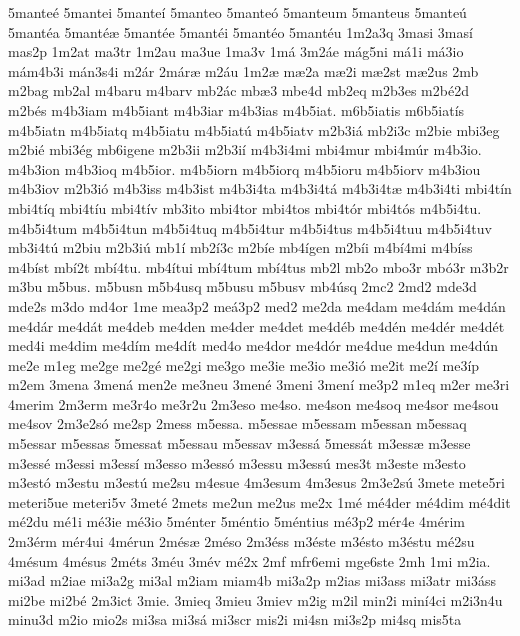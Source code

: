 {5mante^^e9
5mantei
5mante^^ed
5manteo
5mante^^f3
5manteum
5manteus
5mante^^fa
5mant^^e9a
5mant^^e9^^e6
5mant^^e9e
5mant^^e9i
5mant^^e9o
5mant^^e9u
1m2a3q
3masi
3mas^^ed
mas2p
1m2at
ma3tr
1m2au
ma3ue
1ma3v
1m^^e1
3m2^^e1e
m^^e1g5ni
m^^e11i
m^^e13io
m^^e1m4b3i
m^^e1n3s4i
m2^^e1r
2m^^e1r^^e6
m2^^e1u
1m2^^e6
m^^e62a
m^^e62i
m^^e62st
m^^e62us
2mb
m2bag
mb2al
m4baru
m4barv
mb2^^e1c
mb^^e63
mbe4d
mb2eq
m2b3es
m2b^^e92d
m2b^^e9s
m4b3iam
m4b5iant
m4b3iar
m4b3ias
m4b5iat.
m6b5iatis
m6b5iat^^eds
m4b5iatn
m4b5iatq
m4b5iatu
m4b5iat^^fa
m4b5iatv
m2b3i^^e1
mb2i3c
m2bie
mbi3eg
m2bi^^e9
mbi3^^e9g
mb6igene
m2b3ii
m2b3i^^ed
m4b3i4mi
mbi4mur
mbi4m^^far
m4b3io.
m4b3ion
m4b3ioq
m4b5ior.
m4b5iorn
m4b5iorq
m4b5ioru
m4b5iorv
m4b3iou
m4b3iov
m2b3i^^f3
m4b3iss
m4b3ist
m4b3i4ta
m4b3i4t^^e1
m4b3i4t^^e6
m4b3i4ti
mbi4t^^edn
mbi4t^^edq
mbi4t^^edu
mbi4t^^edv
mb3ito
mbi4tor
mbi4tos
mbi4t^^f3r
mbi4t^^f3s
m4b5i4tu.
m4b5i4tum
m4b5i4tun
m4b5i4tuq
m4b5i4tur
m4b5i4tus
m4b5i4tuu
m4b5i4tuv
mb3i4t^^fa
m2biu
m2b3i^^fa
mb1^^ed
mb2^^ed3c
m2b^^ede
mb4^^edgen
m2b^^edi
m4b^^ed4mi
m4b^^edss
m4b^^edst
mb^^ed2t
mb^^ed4tu.
mb4^^edtui
mb^^ed4tum
mb^^ed4tus
mb2l
mb2o
mbo3r
mb^^f33r
m3b2r
m3bu
m5bus.
m5busn
m5b4usq
m5busu
m5busv
mb4^^fasq
2mc2
2md2
mde3d
mde2s
m3do
md4or
1me
mea3p2
me^^e13p2
med2
me2da
me4dam
me4d^^e1m
me4d^^e1n
me4d^^e1r
me4d^^e1t
me4deb
me4den
me4der
me4det
me4d^^e9b
me4d^^e9n
me4d^^e9r
me4d^^e9t
med4i
me4dim
me4d^^edm
me4d^^edt
med4o
me4dor
me4d^^f3r
me4due
me4dun
me4d^^fan
me2e
m1eg
me2ge
me2g^^e9
me2gi
me3go
me3ie
me3io
me3i^^f3
me2it
me2^^ed
me3^^edp
m2em
3mena
3men^^e1
men2e
me3neu
3men^^e9
3meni
3men^^ed
me3p2
m1eq
m2er
me3ri
4merim
2m3erm
me3r4o
me3r2u
2m3eso
me4so.
me4son
me4soq
me4sor
me4sou
me4sov
2m3e2s^^f3
me2sp
2mess
m5essa.
m5essae
m5essam
m5essan
m5essaq
m5essar
m5essas
5messat
m5essau
m5essav
m3ess^^e1
5mess^^e1t
m3ess^^e6
m3esse
m3ess^^e9
m3essi
m3ess^^ed
m3esso
m3ess^^f3
m3essu
m3ess^^fa
mes3t
m3este
m3esto
m3est^^f3
m3estu
m3est^^fa
me2su
m4esue
4m3esum
4m3esus
2m3e2s^^fa
3mete
mete5ri
meteri5ue
meteri5v
3met^^e9
2mets
me2un
me2us
me2x
1m^^e9
m^^e94der
m^^e94dim
m^^e94dit
m^^e92du
m^^e91i
m^^e93ie
m^^e93io
5m^^e9nter
5m^^e9ntio
5m^^e9ntius
m^^e93p2
m^^e9r4e
4m^^e9rim
2m3^^e9rm
m^^e9r4ui
4m^^e9run
2m^^e9s^^e6
2m^^e9so
2m3^^e9ss
m3^^e9ste
m3^^e9sto
m3^^e9stu
m^^e92su
4m^^e9sum
4m^^e9sus
2m^^e9ts
3m^^e9u
3m^^e9v
m^^e92x
2mf
mfr6emi
mge6ste
2mh
1mi
m2ia.
mi3ad
m2iae
mi3a2g
mi3al
m2iam
miam4b
mi3a2p
m2ias
mi3ass
mi3atr
mi3^^e1ss
mi2be
mi2b^^e9
2m3ict
3mie.
3mieq
3mieu
3miev
m2ig
m2il
min2i
min^^ed4ci
m2i3n4u
minu3d
m2io
mio2s
mi3sa
mi3s^^e1
mi3scr
mis2i
mi4sn
mi3s2p
mi4sq
mis5ta
}

